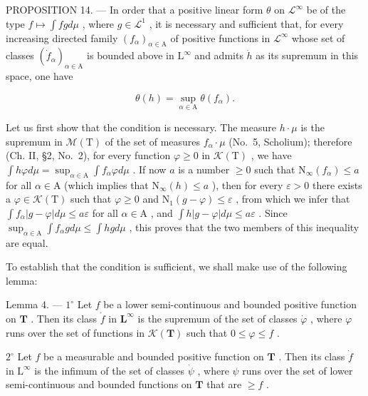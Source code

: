 PROPOSITION 14. --- In order that a positive linear form \(\theta\) on \(\mathcal{L}^{\infty}\) be of the type \(f \mapsto \int fg d\mu\) , where \(g \in \mathcal{L}^{1}\) , it is necessary and sufficient that, for every increasing directed family \((f_{\alpha})_{\alpha \in \mathrm{A}}\) of positive functions in \(\mathcal{L}^{\infty}\) whose set of classes \((\dot{f}_{\alpha})_{\alpha \in \mathrm{A}}\) is bounded above in \(\mathrm{L}^{\infty}\) and admits \(\dot{h}\) as its supremum in this space, one have

\[
\theta (h) = \sup _ {\alpha \in \mathrm{A}} \theta (f _ {\alpha}).
\]

Let us first show that the condition is necessary. The measure \(h \cdot \mu\) is the supremum in \(\mathcal{M}(\mathrm{T})\) of the set of measures \(f_{\alpha} \cdot \mu\) (No.~5, Scholium); therefore (Ch. II, §2, No.~2), for every function \(\varphi \geqslant 0\) in \(\mathcal{K}(\mathrm{T})\) , we have \(\int h\varphi d\mu = \sup_{\alpha \in \mathrm{A}} \int f_{\alpha}\varphi d\mu\) . If now \(a\) is a number \(\geqslant 0\) such that \(\mathrm{N}_{\infty}(f_{\alpha}) \leqslant a\) for all \(\alpha \in \mathrm{A}\) (which implies that \(\mathrm{N}_{\infty}(h) \leqslant a\) ), then for every \(\varepsilon > 0\) there exists a \(\varphi \in \mathcal{K}(\mathrm{T})\) such that \(\varphi \geqslant 0\) and \(\mathrm{N}_1(g - \varphi) \leqslant \varepsilon\) , from which we infer that \(\int f_{\alpha}|g - \varphi| d\mu \leqslant a\varepsilon\) for all \(\alpha \in \mathrm{A}\) , and \(\int h|g - \varphi| d\mu \leqslant a\varepsilon\) . Since \(\sup_{\alpha \in \mathrm{A}} \int f_{\alpha}g d\mu \leqslant \int hg d\mu\) , this proves that the two members of this inequality are equal.

To establish that the condition is sufficient, we shall make use of the following lemma:

Lemma 4. --- \(1^{\circ}\) Let \(f\) be a lower semi-continuous and bounded positive function on \(\mathbf{T}\) . Then its class \(\dot{f}\) in \(\mathbf{L}^{\infty}\) is the supremum of the set of classes \(\dot{\varphi}\) , where \(\varphi\) runs over the set of functions in \(\mathcal{K}(\mathbf{T})\) such that \(0 \leqslant \varphi \leqslant f\) .

\(2^{\circ}\) Let \(f\) be a measurable and bounded positive function on \(\mathbf{T}\) . Then its class \(\dot{f}\) in \(\mathrm{L}^{\infty}\) is the infimum of the set of classes \(\dot{\psi}\) , where \(\psi\) runs over the set of lower semi-continuous and bounded functions on \(\mathbf{T}\) that are \(\geqslant f\) .

